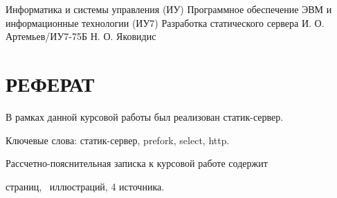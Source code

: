 \documentclass{bmstu}
\begin{document}
\makecourseworktitle
{Информатика и системы управления (ИУ)}
{Программное обеспечение ЭВМ и информационные технологии (ИУ7)}
{Разработка статического сервера}
{И. О. Артемьев/ИУ7-75Б}
{Н. О. Яковидис}
{}
{}
{}

\chapter*{РЕФЕРАТ}

В рамках данной курсовой работы был реализован статик-сервер.

Ключевые слова: статик-сервер, prefork, select, http.

Рассчетно-пояснительная записка к курсовой работе содержит \begin{NoHyper}\pageref{LastPage}\end{NoHyper} страниц, \totfig~иллюстраций, 4 источника.

\clearpage

\maketableofcontents




\end{document}

